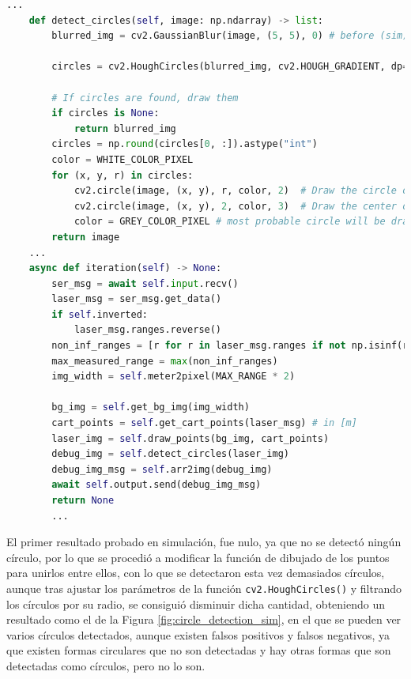 \begin{code}[h!]
  \begin{lstlisting}[language=Python]
    ...
    def detect_circles(self, image: np.ndarray) -> list:
        blurred_img = cv2.GaussianBlur(image, (5, 5), 0) # before (sim) :image, (5, 5), 2

        circles = cv2.HoughCircles(blurred_img, cv2.HOUGH_GRADIENT, dp=1, minDist=40, param1=30, param2=25, minRadius=10, maxRadius=100)

        # If circles are found, draw them
        if circles is None:
            return blurred_img
        circles = np.round(circles[0, :]).astype("int")
        color = WHITE_COLOR_PIXEL
        for (x, y, r) in circles:
            cv2.circle(image, (x, y), r, color, 2)  # Draw the circle outline
            cv2.circle(image, (x, y), 2, color, 3)  # Draw the center of the circle
            color = GREY_COLOR_PIXEL # most probable circle will be drawn in white
        return image
    ...
    async def iteration(self) -> None:
        ser_msg = await self.input.recv()
        laser_msg = ser_msg.get_data()
        if self.inverted:
            laser_msg.ranges.reverse()
        non_inf_ranges = [r for r in laser_msg.ranges if not np.isinf(r)]
        max_measured_range = max(non_inf_ranges)
        img_width = self.meter2pixel(MAX_RANGE * 2)

        bg_img = self.get_bg_img(img_width)
        cart_points = self.get_cart_points(laser_msg) # in [m]
        laser_img = self.draw_points(bg_img, cart_points)
        debug_img = self.detect_circles(laser_img)
        debug_img_msg = self.arr2img(debug_img)
        await self.output.send(debug_img_msg)
        return None
        ...
  \end{lstlisting}
\caption[Funciones de detección de círculos de un nodo de Zenoh-Flow]{Funciones de detección de círculos de un nodo de Zenoh-Flow}
\label{cod:circle_detection}
\end{code}

El primer resultado probado en simulación, fue nulo, ya que no se detectó ningún
círculo, por lo que se procedió a modificar la función de dibujado de los puntos
para unirlos entre ellos, con lo que se detectaron esta vez demasiados círculos,
aunque tras ajustar los parámetros de la función \verb|cv2.HoughCircles()| y
filtrando los círculos por su radio, se consiguió disminuir dicha cantidad,
obteniendo un resultado como el de la Figura \ref{fig:circle_detection_sim}, en
el que se pueden ver varios círculos detectados, aunque existen falsos positivos
y falsos negativos, ya que existen formas circulares que no son detectadas y hay
otras formas que son detectadas como círculos, pero no lo son.
\\

